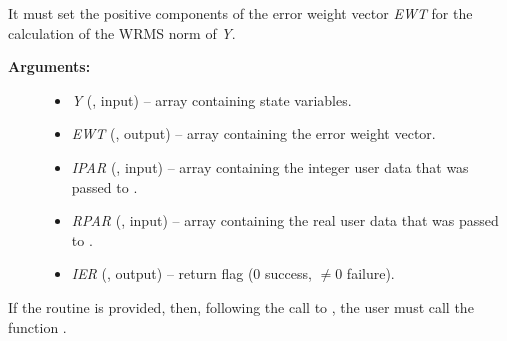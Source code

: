 \documentclass[letterpaper,10pt,english]{sphinxmanual}
\begin{document}
\begin{fulllineitems}
\label{f_interface/Usage:f/_/FARKEWT}
It must set the positive components of the error weight
vector \emph{EWT} for the calculation of the WRMS norm of \emph{Y}.
\begin{description}
\item[{\textbf{Arguments:}}] \leavevmode\begin{itemize}
\item {} 
\emph{Y} (, input) -- array containing state variables.

\item {} 
\emph{EWT} (, output) -- array containing the error weight vector.

\item {} 
\emph{IPAR} (, input) -- array containing the integer user data that was passed
to {\hyperref[f_interface/Usage:f/_/FARKMALLOC]{\emph{}}}.

\item {} 
\emph{RPAR} (, input) -- array containing the real user data that was passed to
{\hyperref[f_interface/Usage:f/_/FARKMALLOC]{\emph{}}}.

\item {} 
\emph{IER} (, output) -- return flag (0 success, \(\ne 0\) failure).

\end{itemize}

\end{description}

\end{fulllineitems}


If the {\hyperref[f_interface/Usage:f/_/FARKEWT]{\emph{}}} routine is provided, then, following the
call to {\hyperref[f_interface/Usage:f/_/FARKMALLOC]{\emph{}}}, the user must call the function
{\hyperref[f_interface/Usage:f/_/FARKEWTSET]{\emph{}}}.
\end{document}
